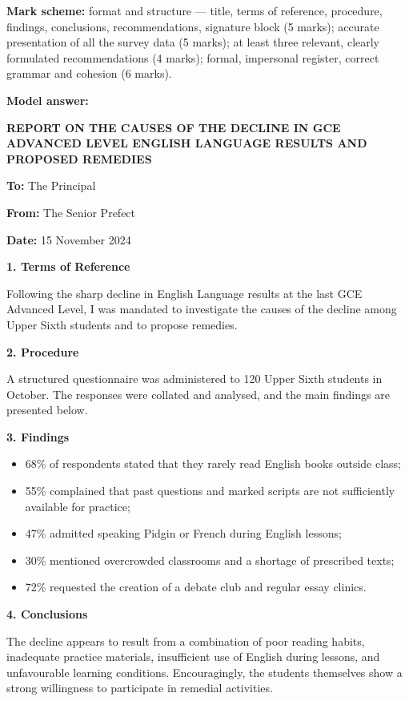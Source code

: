 \documentclass[11pt]{article}
\begin{document}
\begin{corrige}
\textbf{Mark scheme:} format and structure — title, terms of reference, procedure, findings, conclusions, recommendations, signature block (5 marks); accurate presentation of all the survey data (5 marks); at least three relevant, clearly formulated recommendations (4 marks); formal, impersonal register, correct grammar and cohesion (6 marks).

\textbf{Model answer:}

\begin{center}
\textbf{REPORT ON THE CAUSES OF THE DECLINE IN GCE ADVANCED LEVEL ENGLISH LANGUAGE RESULTS AND PROPOSED REMEDIES}
\end{center}

\textbf{To:} The Principal\par
\textbf{From:} The Senior Prefect\par
\textbf{Date:} 15 November 2024

\textbf{1. Terms of Reference}\par
Following the sharp decline in English Language results at the last GCE Advanced Level, I was mandated to investigate the causes of the decline among Upper Sixth students and to propose remedies.

\textbf{2. Procedure}\par
A structured questionnaire was administered to 120 Upper Sixth students in October. The responses were collated and analysed, and the main findings are presented below.

\textbf{3. Findings}
\begin{itemize}
\item 68\% of respondents stated that they rarely read English books outside class;
\item 55\% complained that past questions and marked scripts are not sufficiently available for practice;
\item 47\% admitted speaking Pidgin or French during English lessons;
\item 30\% mentioned overcrowded classrooms and a shortage of prescribed texts;
\item 72\% requested the creation of a debate club and regular essay clinics.
\end{itemize}

\textbf{4. Conclusions}\par
The decline appears to result from a combination of poor reading habits, inadequate practice materials, insufficient use of English during lessons, and unfavourable learning conditions. Encouragingly, the students themselves show a strong willingness to participate in remedial activities.


\end{corrige}
\end{document}
